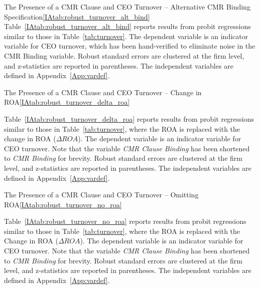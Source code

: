 \documentclass[12pt]{article}
\begin{document}
\begin{appendices}
\begin{singlespace}
\begin{papertable}{The Presence of a CMR Clause and CEO Turnover -- Alternative CMR Binding Specification}{\ref{IAtab:robust_turnover_alt_bind}}{}
  Table~\ref{IAtab:robust_turnover_alt_bind} reports results from probit regressions similar to those in Table~\ref{tab:turnover}.
  The dependent variable is an indicator variable for CEO turnover, which has been hand-verified to eliminate noise in the CMR Binding variable.
  Robust standard errors are clustered at the firm level, and z-statistics are reported in parentheses.
  The independent variables are defined in Appendix~\ref{App:vardef}.
  \postamblesig

  \startdata
  

\end{papertable}



\begin{papertable}{The Presence of a CMR Clause and CEO Turnover -- Change in ROA}{\ref{IAtab:robust_turnover_delta_roa}}{}
  \label{IAtab:robust_turnover_delta_roa}

  Table~\ref{IAtab:robust_turnover_delta_roa} reports results from probit regressions similar to those in Table~\ref{tab:turnover}, where the ROA is replaced with the change in ROA ($\Delta ROA$).
  The dependent variable is an indicator variable for CEO turnover.
  Note that the variable \textit{CMR Clause Binding} has been shortened to \textit{CMR Binding} for brevity.
  Robust standard errors are clustered at the firm level, and z-statistics are reported in parentheses.
  The independent variables are defined in Appendix~\ref{App:vardef}.
  \postamblesig

  \startdata
  

\end{papertable}




\begin{papertable}{The Presence of a CMR Clause and CEO Turnover -- Omitting ROA}{\ref{IAtab:robust_turnover_no_roa}}{}
  \label{IAtab:robust_turnover_no_roa}

  Table~\ref{IAtab:robust_turnover_no_roa} reports results from probit regressions similar to those in Table~\ref{tab:turnover}, where the ROA is replaced with the Change in ROA ($\Delta ROA$).
  The dependent variable is an indicator variable for CEO turnover.
  Note that the variable \textit{CMR Clause Binding} has been shortened to \textit{CMR Binding} for brevity.
  Robust standard errors are clustered at the firm level, and z-statistics are reported in parentheses.
  The independent variables are defined in Appendix~\ref{App:vardef}.
  \postamblesig


\end{papertable}
\end{singlespace}
\end{appendices}
\end{document}
